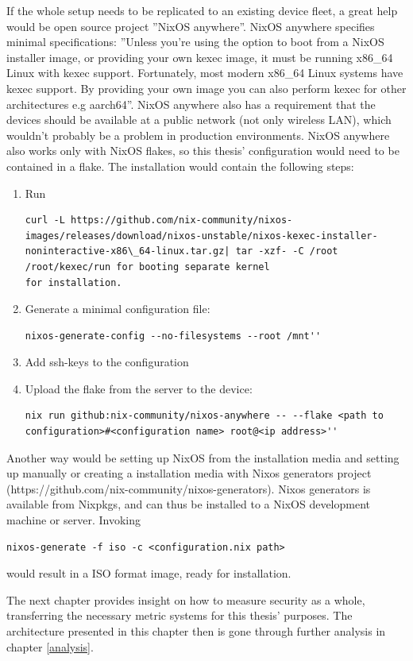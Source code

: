If the whole setup needs to be replicated to an existing device fleet,
a great help would be open source project ''NixOS anywhere''. NixOS
anywhere specifies minimal specifications: ''Unless you're using the
option to boot from a NixOS installer image, or providing your own
kexec image, it must be running x86\_64 Linux with kexec
support. Fortunately, most modern x86\_64 Linux systems have kexec
support. By providing your own image you can also perform kexec for
other architectures e.g aarch64''. NixOS anywhere also has a
requirement that the devices should be available at a public network
(not only wireless LAN), which wouldn't probably be a problem in
production environments. NixOS anywhere also works only with NixOS
flakes, so this thesis' configuration would need to be contained in a
flake. \cite{githubGitHubNixcommunitynixosanywhere}
The installation would contain the following steps:
\begin{enumerate}
\item Run
\begin{lstlisting}
curl -L https://github.com/nix-community/nixos-images/releases/download/nixos-unstable/nixos-kexec-installer-noninteractive-x86\_64-linux.tar.gz| tar -xzf- -C /root /root/kexec/run for booting separate kernel
for installation.
\end{lstlisting}
\item Generate a minimal configuration file:
\begin{lstlisting}
nixos-generate-config --no-filesystems --root /mnt''
\end{lstlisting}
\item Add ssh-keys to the configuration
\item Upload the flake from the server to the device:
\begin{lstlisting}
nix run github:nix-community/nixos-anywhere -- --flake <path to configuration>#<configuration name> root@<ip address>''
\end{lstlisting}
\end{enumerate}
Another way would be setting up NixOS from the installation media and
setting up manually or creating a installation media with Nixos
generators project
(https://github.com/nix-community/nixos-generators). Nixos generators
is available from Nixpkgs, and can thus be installed to a NixOS
development machine or server. Invoking
\begin{lstlisting}
nixos-generate -f iso -c <configuration.nix path>
\end{lstlisting}
would result in a ISO format image, ready for
installation. \cite{githubGitHubNixcommunitynixosanywhere}

The next chapter provides insight on how to measure security as a
whole, transferring the necessary metric systems for this thesis'
purposes. The architecture presented in this chapter then is gone
through further analysis in chapter \ref{analysis}.
